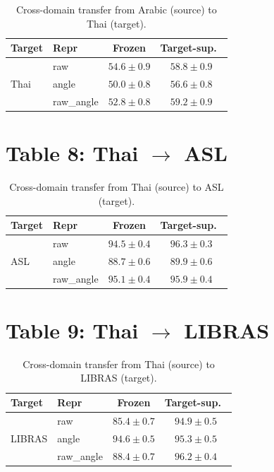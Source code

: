 \documentclass[11pt,a4paper]{article}
\begin{document}
\begin{table}[H]
\centering
\small
\caption{Cross-domain transfer from Arabic (source) to Thai (target).}
\label{tab:arabic-thai}
\begin{tabular}{@{}llcc@{}}
\toprule
Target & Repr & Frozen & Target-sup.\ \\
\midrule
\multirow{3}{*}{Thai}
  & raw        & $\mathbf{54.6 \pm 0.9}$ & $58.8 \pm 0.9$ \\
  & angle      & $50.0 \pm 0.8$ & $56.6 \pm 0.8$ \\
  & raw\_angle & $52.8 \pm 0.8$ & $\mathbf{59.2 \pm 0.9}$ \\
\bottomrule
\end{tabular}
\end{table}

\vspace{-0.5em}
\section*{Table 8: Thai $\rightarrow$ ASL}
\vspace{-0.5em}

\begin{table}[H]
\centering
\small
\caption{Cross-domain transfer from Thai (source) to ASL (target).}
\label{tab:thai-asl}
\begin{tabular}{@{}llcc@{}}
\toprule
Target & Repr & Frozen & Target-sup.\ \\
\midrule
\multirow{3}{*}{ASL}
  & raw        & $94.5 \pm 0.4$ & $96.3 \pm 0.3$ \\
  & angle      & $88.7 \pm 0.6$ & $89.9 \pm 0.6$ \\
  & raw\_angle & $\mathbf{95.1 \pm 0.4}$ & $\mathbf{95.9 \pm 0.4}$ \\
\bottomrule
\end{tabular}
\end{table}

\vspace{-0.5em}
\section*{Table 9: Thai $\rightarrow$ LIBRAS}
\vspace{-0.5em}

\begin{table}[H]
\centering
\small
\caption{Cross-domain transfer from Thai (source) to LIBRAS (target).}
\label{tab:thai-libras}
\begin{tabular}{@{}llcc@{}}
\toprule
Target & Repr & Frozen & Target-sup.\ \\
\midrule
\multirow{3}{*}{LIBRAS}
  & raw        & $85.4 \pm 0.7$ & $94.9 \pm 0.5$ \\
  & angle      & $\mathbf{94.6 \pm 0.5}$ & $95.3 \pm 0.5$ \\
  & raw\_angle & $88.4 \pm 0.7$ & $\mathbf{96.2 \pm 0.4}$ \\
\bottomrule
\end{tabular}
\end{table}
\end{document}
